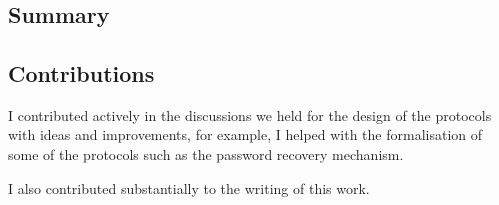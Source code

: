 

\section{}
\begingroup\centering
\begin{ppBox}
\end{ppBox}
\endgroup

\subsection{Summary}
    \label{subsection:summary-p2p}



\subsection{Contributions}
    \label{subsection:contributions-p2p}
I contributed actively in the discussions we held for the design of the protocols 
with ideas and improvements, for example, I helped with the formalisation of some 
of the protocols such as the password recovery mechanism. 

I also contributed substantially to the writing of this work.


